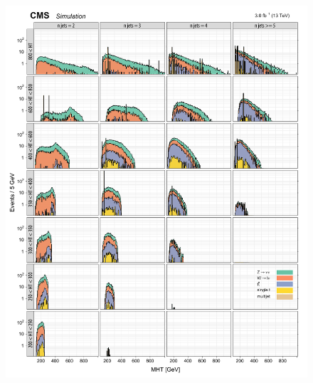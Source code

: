 \begin{figure}[!h]
\centering
\includegraphics[scale=0.95]{figures/kiplots/c150107_s150318_f015_MHT_100}
\end{figure}

